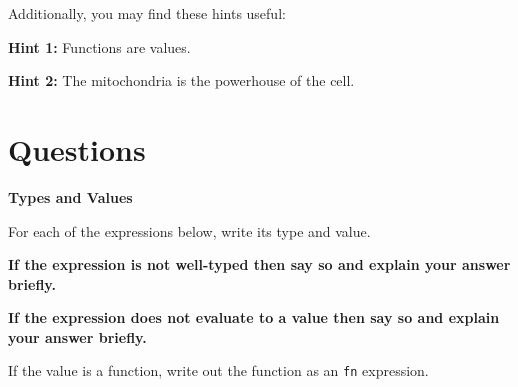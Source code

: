 \documentclass[addpoints,12pt]{exam}
\begin{document}
Additionally, you may find these hints useful:

\vspace{1em}

\textbf{Hint 1:} Functions are values.

\textbf{Hint 2:} The mitochondria is the powerhouse of the cell.

\newpage


\section*{Questions}

\begin{questions}

\textbf{Types and Values}

For each of the expressions below, write its type and value.

\textbf{If the expression is not well-typed then say so and explain your answer briefly.}

\textbf{If the expression does not evaluate to a value then say so and explain your answer briefly.}

If the value is a function, write out the function as an \texttt{fn} expression.

\end{questions}
\end{document}
